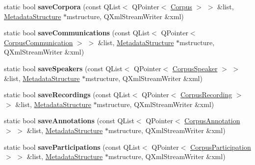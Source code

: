 \begin{DoxyCompactItemize}
\item 
\mbox{\label{class_x_m_l_serialiser_metadata_afd5185a556af8e17ed893258ec750c1a}} 
static bool {\bfseries save\+Corpora} (const Q\+List$<$ Q\+Pointer$<$ \hyperlink{class_corpus}{Corpus} $>$ $>$ \&list, \hyperlink{class_metadata_structure}{Metadata\+Structure} $\ast$mstructure, Q\+Xml\+Stream\+Writer \&xml)
\item 
\mbox{\label{class_x_m_l_serialiser_metadata_ae9f864cf9fdcbcb5ae0a2628d7a9b095}} 
static bool {\bfseries save\+Communications} (const Q\+List$<$ Q\+Pointer$<$ \hyperlink{class_corpus_communication}{Corpus\+Communication} $>$ $>$ \&list, \hyperlink{class_metadata_structure}{Metadata\+Structure} $\ast$mstructure, Q\+Xml\+Stream\+Writer \&xml)
\item 
\mbox{\label{class_x_m_l_serialiser_metadata_a49bcf59521bb446400f2a0b3b31433ae}} 
static bool {\bfseries save\+Speakers} (const Q\+List$<$ Q\+Pointer$<$ \hyperlink{class_corpus_speaker}{Corpus\+Speaker} $>$ $>$ \&list, \hyperlink{class_metadata_structure}{Metadata\+Structure} $\ast$mstructure, Q\+Xml\+Stream\+Writer \&xml)
\item 
\mbox{\label{class_x_m_l_serialiser_metadata_a15d1b04ae4298eea6f0c3c536a2ae4f9}} 
static bool {\bfseries save\+Recordings} (const Q\+List$<$ Q\+Pointer$<$ \hyperlink{class_corpus_recording}{Corpus\+Recording} $>$ $>$ \&list, \hyperlink{class_metadata_structure}{Metadata\+Structure} $\ast$mstructure, Q\+Xml\+Stream\+Writer \&xml)
\item 
\mbox{\label{class_x_m_l_serialiser_metadata_a777bfcef668a6289a81fab5a607ca2e4}} 
static bool {\bfseries save\+Annotations} (const Q\+List$<$ Q\+Pointer$<$ \hyperlink{class_corpus_annotation}{Corpus\+Annotation} $>$ $>$ \&list, \hyperlink{class_metadata_structure}{Metadata\+Structure} $\ast$mstructure, Q\+Xml\+Stream\+Writer \&xml)
\item 
\mbox{\label{class_x_m_l_serialiser_metadata_ac15efc880c6b16cd6a84fbf56d939a7a}} 
static bool {\bfseries save\+Participations} (const Q\+List$<$ Q\+Pointer$<$ \hyperlink{class_corpus_participation}{Corpus\+Participation} $>$ $>$ \&list, \hyperlink{class_metadata_structure}{Metadata\+Structure} $\ast$mstructure, Q\+Xml\+Stream\+Writer \&xml)

\end{DoxyCompactItemize}

